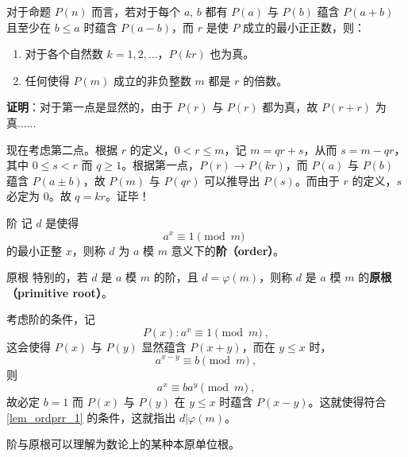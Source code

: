 
\begin{lemma}{}\label{lem_ordprr_1}
对于命题 $P(n)$ 而言，若对于每个 $a$, $b$ 都有 $P(a)$ 与 $P(b)$ 蕴含 $P(a+b)$ 且至少在 $b \le a$ 时蕴含 $P(a-b)$，而 $r$ 是使 $P$ 成立的最小正正数，则：
\begin{enumerate}
\item 对于各个自然数 $k = 1, 2, \dots$，$P(kr)$ 也为真。
\item 任何使得 $P(m)$ 成立的非负整数 $m$ 都是 $r$ 的倍数。
\end{enumerate}
\end{lemma}
\textbf{证明}：对于第一点是显然的，由于 $P(r)$ 与 $P(r)$ 都为真，故 $P(r+r)$ 为真......

现在考虑第二点。根据 $r$ 的定义，$0 < r \le m$，记 $m = qr + s$，从而 $s = m - qr$，其中 $0 \le s < r$ 而 $q \ge 1$。根据第一点，$P(r) \rightarrow P(kr)$，而 $P(a)$ 与 $P(b)$ 蕴含 $P(a \pm b)$，故 $P(m)$ 与 $P(qr)$ 可以推导出 $P(s)$。而由于 $r$ 的定义，$s$ 必定为 $0$。故 $q = kr$。证毕！


\begin{definition}{阶}
记 $d$ 是使得
\begin{equation}
a^x \equiv 1 \pmod m ~~
\end{equation}
的最小正整 $x$，则称 $d$ 为 $a$ 模 $m$ 意义下的\textbf{阶（order）}。
\end{definition}

\begin{definition}{原根}
特别的，若 $d$ 是 $a$ 模 $m$ 的阶，且 $d = \varphi(m)$，则称 $d$ 是 $a$ 模 $m$ 的\textbf{原根（primitive root）}。
\end{definition}

考虑阶的条件，记
\begin{equation}
P(x) : a^x \equiv 1 \pmod m ~,
\end{equation}
这会使得 $P(x)$ 与 $P(y)$ 显然蕴含 $P(x+y)$，而在 $y \le x$ 时，
\begin{equation}
a^{x-y} \equiv b \pmod m ~,
\end{equation}
则
\begin{equation}
a^x \equiv b a^y \pmod m ~,
\end{equation}
故必定 $b=1$ 而 $P(x)$ 与 $P(y)$ 在 $y \le x$ 时蕴含 $P(x-y)$。这就使得符合\autoref{lem_ordprr_1} 的条件，这就指出 $d | \varphi(m)$。

阶与原根可以理解为数论上的某种本原单位根。
